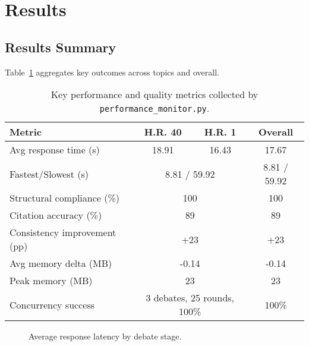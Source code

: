 \documentclass{article}
\begin{document}
\section{Results}

\subsection{Results Summary}

Table~\ref{tab:summary} aggregates key outcomes across topics and overall.

\begin{table}[t]
\centering
\small
\begin{tabular}{lccc}
\toprule
\textbf{Metric} & \textbf{H.R. 40} & \textbf{H.R. 1} & \textbf{Overall} \\
\midrule
Avg response time (s) & 18.91 & 16.43 & 17.67 \\
Fastest/Slowest (s) & \multicolumn{2}{c}{8.81 / 59.92} & 8.81 / 59.92 \\
Structural compliance (\%) & \multicolumn{2}{c}{100} & 100 \\
Citation accuracy (\%) & \multicolumn{2}{c}{89} & 89 \\
Consistency improvement (pp) & \multicolumn{2}{c}{+23} & +23 \\
Avg memory delta (MB) & \multicolumn{2}{c}{-0.14} & -0.14 \\
Peak memory (MB) & \multicolumn{2}{c}{23} & 23 \\
Concurrency success & \multicolumn{2}{c}{3 debates, 25 rounds, 100\%} & 100\% \\
\bottomrule
\end{tabular}
\caption{Key performance and quality metrics collected by \texttt{performance\_monitor.py}.}
\label{tab:summary}
\end{table}

\begin{figure}[t]
\centering
{}
\caption{Average response latency by debate stage.}
\label{fig:response-latency}
\end{figure}
\end{document}
